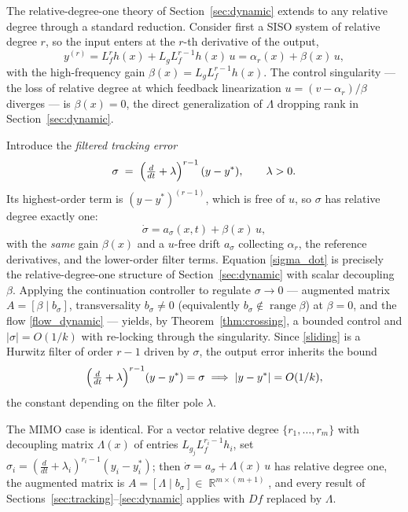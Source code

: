 \documentclass[11pt,american]{article}
\DeclareMathOperator{\R}{\mathbb{R}}
\DeclareMathOperator{\range}{range}
\theoremstyle{definition}
\theoremstyle{plain}
\theoremstyle{remark}
\begin{document}
The relative-degree-one theory of Section~\ref{sec:dynamic} extends to any relative degree through a standard reduction. Consider first a SISO system of relative degree $r$, so the input enters at the $r$-th derivative of the output,
\begin{equation}\label{rdr}
y^{(r)} = L_f^r h(x) + L_g L_f^{r-1} h(x)\,u = \alpha_r(x) + \beta(x)\,u,
\end{equation}
with the high-frequency gain $\beta(x) = L_g L_f^{r-1} h(x)$. The control singularity --- the loss of relative degree at which feedback linearization $u = (v - \alpha_r)/\beta$ diverges --- is $\beta(x) = 0$, the direct generalization of $\Lambda$ dropping rank in Section~\ref{sec:dynamic}.

Introduce the \emph{filtered tracking error}
\begin{equation}\label{sliding}
\sigma \;=\; \Bigl(\tfrac{d}{dt} + \lambda\Bigr)^{r-1}\,(y - y^*), \qquad \lambda > 0 .
\end{equation}
Its highest-order term is $(y-y^*)^{(r-1)}$, which is free of $u$, so $\sigma$ has relative degree exactly one:
\begin{equation}\label{sigma_dot}
\dot\sigma = a_\sigma(x,t) + \beta(x)\,u,
\end{equation}
with the \emph{same} gain $\beta(x)$ and a $u$-free drift $a_\sigma$ collecting $\alpha_r$, the reference derivatives, and the lower-order filter terms. Equation \eqref{sigma_dot} is precisely the relative-degree-one structure of Section~\ref{sec:dynamic} with scalar decoupling $\beta$. Applying the continuation controller to regulate $\sigma \to 0$ --- augmented matrix $A = [\beta \mid b_\sigma]$, transversality $b_\sigma \ne 0$ (equivalently $b_\sigma \notin \range\beta$) at $\beta = 0$, and the flow \eqref{flow_dynamic} --- yields, by Theorem~\ref{thm:crossing}, a bounded control and $|\sigma| = O(1/k)$ with re-locking through the singularity. Since \eqref{sliding} is a Hurwitz filter of order $r-1$ driven by $\sigma$, the output error inherits the bound
\begin{equation}
\Bigl(\tfrac{d}{dt}+\lambda\Bigr)^{r-1}(y - y^*) = \sigma \;\Longrightarrow\; |y - y^*| = O(1/k),
\end{equation}
the constant depending on the filter pole $\lambda$.

The MIMO case is identical. For a vector relative degree $\{r_1,\dots,r_m\}$ with decoupling matrix $\Lambda(x)$ of entries $L_{g_j} L_f^{r_i-1} h_i$, set $\sigma_i = (\tfrac{d}{dt}+\lambda_i)^{r_i-1}(y_i - y_i^*)$; then $\dot\sigma = a_\sigma + \Lambda(x)\,u$ has relative degree one, the augmented matrix is $A = [\Lambda \mid b_\sigma] \in \R^{m\times(m+1)}$, and every result of Sections~\ref{sec:tracking}--\ref{sec:dynamic} applies with $D f$ replaced by $\Lambda$.
\end{document}
